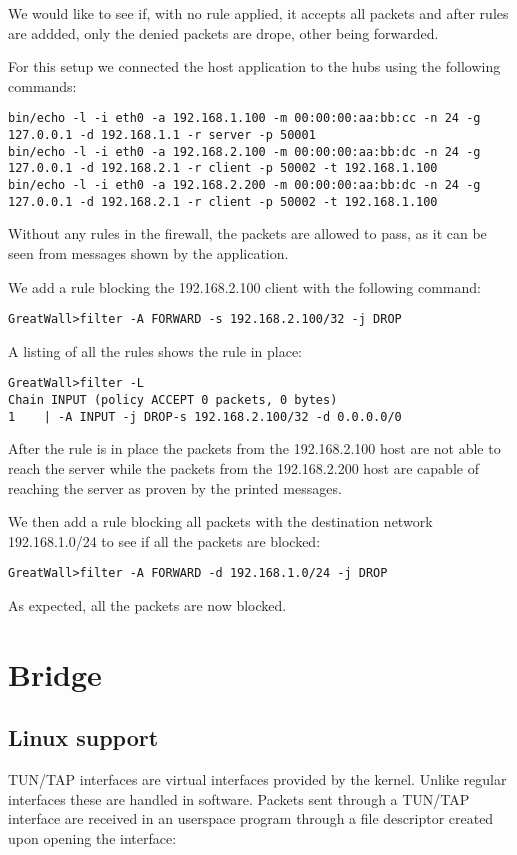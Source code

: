 We would like to see if, with no rule applied, it accepts all packets and after rules are addded, only the denied packets
are drope, other being forwarded.

For this setup we connected the host application to the hubs using the following commands:
\begin{lstlisting}
bin/echo -l -i eth0 -a 192.168.1.100 -m 00:00:00:aa:bb:cc -n 24 -g 127.0.0.1 -d 192.168.1.1 -r server -p 50001
bin/echo -l -i eth0 -a 192.168.2.100 -m 00:00:00:aa:bb:dc -n 24 -g 127.0.0.1 -d 192.168.2.1 -r client -p 50002 -t 192.168.1.100
bin/echo -l -i eth0 -a 192.168.2.200 -m 00:00:00:aa:bb:dc -n 24 -g 127.0.0.1 -d 192.168.2.1 -r client -p 50002 -t 192.168.1.100
\end{lstlisting}
Without any rules in the firewall, the packets are allowed to pass, as it can be seen from messages shown by the application.

We add a rule blocking the 192.168.2.100 client with the following command:
\begin{lstlisting}
GreatWall>filter -A FORWARD -s 192.168.2.100/32 -j DROP
\end{lstlisting}
A listing of all the rules shows the rule in place:
\begin{lstlisting}
GreatWall>filter -L
Chain INPUT (policy ACCEPT 0 packets, 0 bytes)
1	 | -A INPUT -j DROP-s 192.168.2.100/32 -d 0.0.0.0/0
\end{lstlisting}
After the rule is in place the packets from the 192.168.2.100 host are not able to reach the server while the packets from
the 192.168.2.200 host are capable of reaching the server as proven by the printed messages.

We then add a rule blocking all packets with the destination network 192.168.1.0/24 to see if all the packets are blocked:
\begin{lstlisting}
GreatWall>filter -A FORWARD -d 192.168.1.0/24 -j DROP
\end{lstlisting}
As expected, all the packets are now blocked.

\section{Bridge}

\subsection{Linux support}
\label{sub-sec:bridge-lin}

TUN/TAP interfaces are virtual interfaces provided by the kernel. Unlike regular interfaces
these are handled in software. Packets sent through a TUN/TAP interface are received in
an userspace program through a file descriptor created upon opening the interface: 

